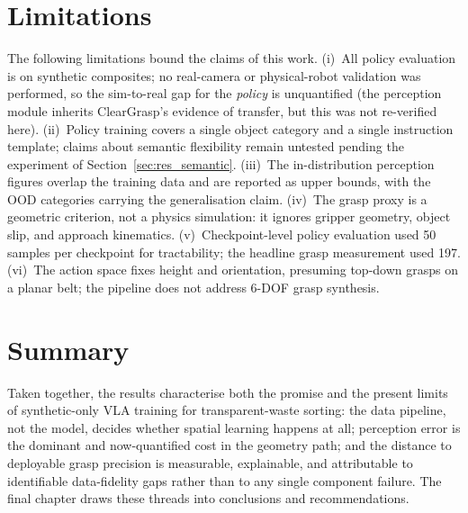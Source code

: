  
\section{Limitations}
\label{sec:disc_limitations}

The following limitations bound the claims of this work. (i)~All policy evaluation is on synthetic composites; no real-camera or physical-robot validation was performed, so the sim-to-real gap for the \emph{policy} is unquantified (the perception module inherits ClearGrasp's evidence of transfer, but this was not re-verified here). (ii)~Policy training covers a single object category and a single instruction template; claims about semantic flexibility remain untested pending the experiment of Section~\ref{sec:res_semantic}. (iii)~The in-distribution perception figures overlap the training data and are reported as upper bounds, with the OOD categories carrying the generalisation claim. (iv)~The grasp proxy is a geometric criterion, not a physics simulation: it ignores gripper geometry, object slip, and approach kinematics. (v)~Checkpoint-level policy evaluation used 50 samples per checkpoint for tractability; the headline grasp measurement used 197. (vi)~The action space fixes height and orientation, presuming top-down grasps on a planar belt; the pipeline does not address 6-DOF grasp synthesis.

\section{Summary}
\label{sec:disc_summary}

Taken together, the results characterise both the promise and the present limits of synthetic-only VLA training for transparent-waste sorting: the data pipeline, not the model, decides whether spatial learning happens at all; perception error is the dominant and now-quantified cost in the geometry path; and the distance to deployable grasp precision is measurable, explainable, and attributable to identifiable data-fidelity gaps rather than to any single component failure. The final chapter draws these threads into conclusions and recommendations.